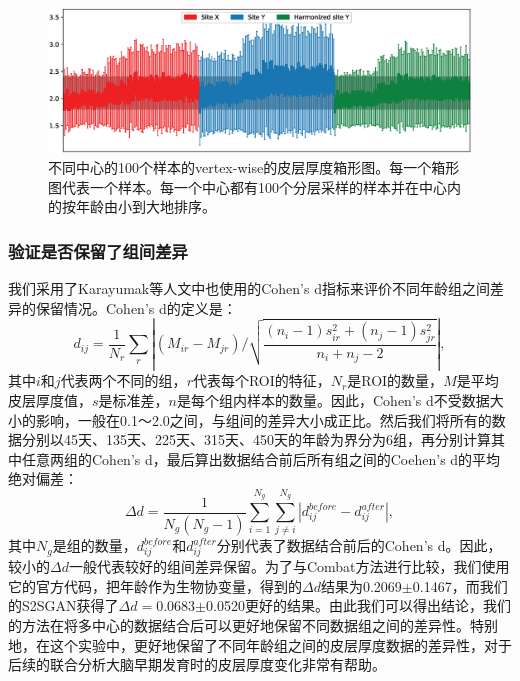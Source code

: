 \begin{figure}[t]
\centering
\includegraphics[width=\textwidth]{figure/s2sgan_boxplot.eps}
\caption{不同中心的100个样本的vertex-wise的皮层厚度箱形图。每一个箱形图代表一个样本。每一个中心都有100个分层采样的样本并在中心内的按年龄由小到大地排序。}\label{fig:s2sgan_boxplot} 
\end{figure} 

\subsubsection{验证是否保留了组间差异}
我们采用了Karayumak等人\cite{karayumak2019retrospective}文中也使用的Cohen's d指标来评价不同年龄组之间差异的保留情况。Cohen's d的定义是：
\begin{equation}
 {d_{ij}} = \frac{1}{{{N_r}}}\sum\limits_r {\left| {({M_{ir}} - {M_{jr}})/\sqrt {\frac{{({n_i} - 1)s_{ir}^2 + ({n_j} - 1)s_{jr}^2}}{{{n_i} + {n_j} - 2}}} } \right|},
\end{equation}
其中$i$和$j$代表两个不同的组，$r$代表每个ROI的特征，$N_r$是ROI的数量，$M$是平均皮层厚度值，$s$是标准差，$n$是每个组内样本的数量。因此，Cohen's d不受数据大小的影响，一般在0.1～2.0之间，与组间的差异大小成正比。然后我们将所有的数据分别以45天、135天、225天、315天、450天的年龄为界分为6组，再分别计算其中任意两组的Cohen's d，最后算出数据结合前后所有组之间的Coehen's d的平均绝对偏差：
\begin{equation}
     \Delta d = \frac{1}{{{N_g}({N_g} - 1)}}\sum\limits_{i = 1}^{{N_g}} {\sum\limits_{j \ne i}^{{N_g}} {\left| {d_{ij}^{before} - d_{ij}^{after}} \right|} },
\end{equation}
其中$N_g$是组的数量，$d_{ij}^{before}$和$d_{ij}^{after}$分别代表了数据结合前后的Cohen's d。因此，较小的$\Delta d$一般代表较好的组间差异保留。为了与Combat方法进行比较，我们使用它的官方代码，把年龄作为生物协变量，得到的$\Delta d$结果为0.2069$\pm$0.1467，而我们的S2SGAN获得了$\Delta d=$0.0683$\pm$0.0520更好的结果。由此我们可以得出结论，我们的方法在将多中心的数据结合后可以更好地保留不同数据组之间的差异性。特别地，在这个实验中，更好地保留了不同年龄组之间的皮层厚度数据的差异性，对于后续的联合分析大脑早期发育时的皮层厚度变化非常有帮助。

